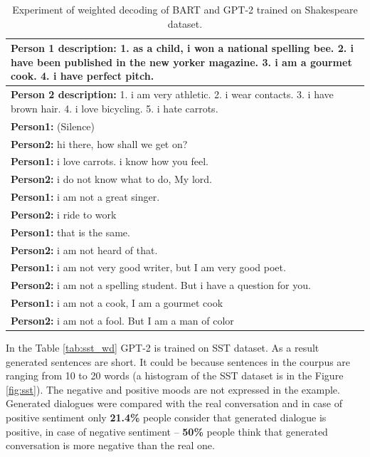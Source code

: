 \begin{table}[H]
\centering
 \begin{tabular}{|p{14cm}|} 
 \hline
 \textbf{Person 1 description:} 1. as a child, i won a national spelling bee. 2. i have been published in the new yorker magazine. 3. i am a gourmet cook. 4. i have perfect pitch. \\
 \hline
 \textbf{Person 2 description:} 1. i am very athletic. 2. i wear contacts. 3. i have brown hair. 4. i love bicycling. 5. i hate carrots. \\
 \hline
 \textbf{Person1:} (Silence) \\
 \textbf{Person2:} hi there, how shall we get on?  \\ 
 \textbf{Person1:} i love carrots. i know how you feel. \\
 \textbf{Person2:} i do not know what to do, My lord. \\
 \textbf{Person1:} i am not a great singer. \\
 \textbf{Person2:} i ride to work \\
 \textbf{Person1:} that is the same. \\
 \textbf{Person2:} i am not heard of that. \\
 \textbf{Person1:} i am not very good writer, but I am very good poet. \\
 \textbf{Person2:} i am not a spelling student. But i have a question for you. \\
 \textbf{Person1:} i am not a cook, I am a gourmet cook \\
 \textbf{Person2:} i am not a fool. But I am a man of color  \\
 \hline
 \end{tabular}
 \caption{Experiment of weighted decoding of BART and GPT-2 trained on Shakespeare dataset.}
\label{tab:poetic_shakespear}
\end{table}

In the Table \ref{tab:sst_wd} GPT-2 is trained on SST dataset. As a result generated sentences are short. It could be because sentences in the courpus are ranging from 10 to 20 words (a histogram of the SST dataset is in the Figure \ref{fig:sst}). The negative and positive moods are not expressed in the example. Generated dialogues were compared with the real conversation and in case of positive sentiment only \textbf{21.4\%} people consider that generated dialogue is positive, in case of negative sentiment -- \textbf{50\%} people think that generated conversation is more negative than the real one. 

